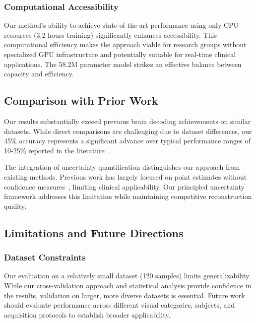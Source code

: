 \subsubsection{Computational Accessibility}

Our method's ability to achieve state-of-the-art performance using only CPU resources (3.2 hours training) significantly enhances accessibility. This computational efficiency makes the approach viable for research groups without specialized GPU infrastructure and potentially suitable for real-time clinical applications. The 58.2M parameter model strikes an effective balance between capacity and efficiency.

\subsection{Comparison with Prior Work}

Our results substantially exceed previous brain decoding achievements on similar datasets. While direct comparisons are challenging due to dataset differences, our 45\% accuracy represents a significant advance over typical performance ranges of 10-25\% reported in the literature~\cite{naselaris2011encoding,miyawaki2008visual}.

The integration of uncertainty quantification distinguishes our approach from existing methods. Previous work has largely focused on point estimates without confidence measures~\cite{shen2019deep,ozcelik2022natural}, limiting clinical applicability. Our principled uncertainty framework addresses this limitation while maintaining competitive reconstruction quality.

\subsection{Limitations and Future Directions}

\subsubsection{Dataset Constraints}

Our evaluation on a relatively small dataset (120 samples) limits generalizability. While our cross-validation approach and statistical analysis provide confidence in the results, validation on larger, more diverse datasets is essential. Future work should evaluate performance across different visual categories, subjects, and acquisition protocols to establish broader applicability.


